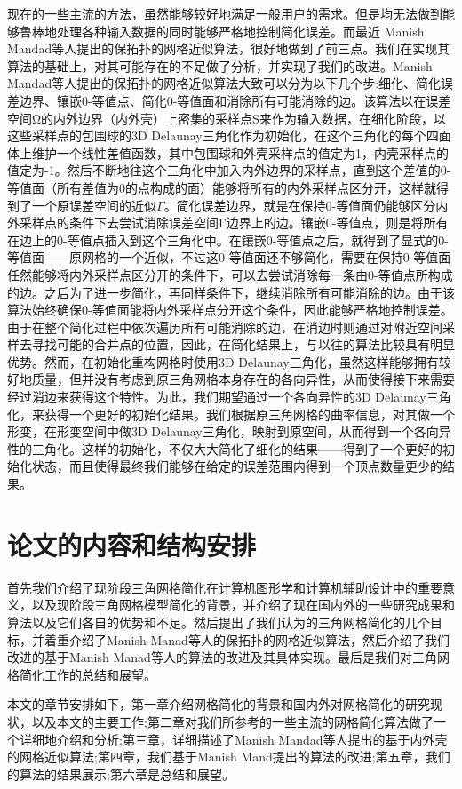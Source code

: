 现在的一些主流的方法，虽然能够较好地满足一般用户的需求。但是均无法做到能够鲁棒地处理各种输入数据的同时能够严格地控制简化误差。而最近 Manish Mandad等人提出的保拓扑的网格近似算法\cite{isotopic-appro}，很好地做到了前三点。我们在实现其算法的基础上，对其可能存在的不足做了分析，并实现了我们的改进。Manish Mandad等人提出的保拓扑的网格近似算法大致可以分为以下几个步:细化、简化误差边界、镶嵌0-等值点、简化0-等值面和消除所有可能消除的边。该算法以在误差空间Ω的内外边界（内外壳）上密集的采样点S来作为输入数据，在细化阶段，以这些采样点的包围球的3D Delaunay三角化作为初始化，在这个三角化的每个四面体上维护一个线性差值函数，其中包围球和外壳采样点的值定为1，内壳采样点的值定为-1。然后不断地往这个三角化中加入内外边界的采样点，直到这个差值的0-等值面（所有差值为0的点构成的面）能够将所有的内外采样点区分开，这样就得到了一个原误差空间的近似$\Gamma$。简化误差边界，就是在保持0-等值面仍能够区分内外采样点的条件下去尝试消除误差空间Γ边界上的边。镶嵌0-等值点，则是将所有在边上的0-等值点插入到这个三角化中。在镶嵌0-等值点之后，就得到了显式的0-等值面——原网格的一个近似，不过这0-等值面还不够简化，需要在保持0-等值面任然能够将内外采样点区分开的条件下，可以去尝试消除每一条由0-等值点所构成的边。之后为了进一步简化，再同样条件下，继续消除所有可能消除的边。由于该算法始终确保0-等值面能将内外采样点分开这个条件，因此能够严格地控制误差。由于在整个简化过程中依次遍历所有可能消除的边，在消边时则通过对附近空间采样去寻找可能的合并点的位置，因此，在简化结果上，与以往的算法比较具有明显优势。然而，在初始化重构网格时使用3D Delaunay三角化，虽然这样能够拥有较好地质量，但并没有考虑到原三角网格本身存在的各向异性，从而使得接下来需要经过消边来获得这个特性。为此，我们期望通过一个各向异性的3D Delaunay三角化，来获得一个更好的初始化结果。我们根据原三角网格的曲率信息，对其做一个形变，在形变空间中做3D Delaunay三角化，映射到原空间，从而得到一个各向异性的三角化。这样的初始化，不仅大大简化了细化的结果——得到了一个更好的初始化状态，而且使得最终我们能够在给定的误差范围内得到一个顶点数量更少的结果。

\section{论文的内容和结构安排}
首先我们介绍了现阶段三角网格简化在计算机图形学和计算机辅助设计中的重要意义，以及现阶段三角网格模型简化的背景，并介绍了现在国内外的一些研究成果和算法以及它们各自的优势和不足。然后提出了我们认为的三角网格简化的几个目标，并着重介绍了Manish Manad等人的保拓扑的网格近似算法，然后介绍了我们改进的基于Manish Manad等人的算法的改进及其具体实现。最后是我们对三角网格简化工作的总结和展望。\par
本文的章节安排如下，第一章介绍网格简化的背景和国内外对网格简化的研究现状，以及本文的主要工作;第二章对我们所参考的一些主流的网格简化算法做了一个详细地介绍和分析;第三章，详细描述了Manish Mandad等人提出的基于内外壳的网格近似算法;第四章，我们基于Manish Mand提出的算法的改进;第五章，我们的算法的结果展示;第六章是总结和展望。
